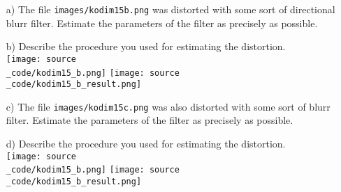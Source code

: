 \begin{enumerate}

\item[a)] The file \texttt{images/kodim15b.png} was distorted with some sort of directional blurr filter. Estimate the parameters of the filter as precisely as possible.
\item[b)] Describe the procedure you used for estimating the distortion. \\
\texttt{[image: source\\\_code/kodim15\_b.png]}
\texttt{[image: source\\\_code/kodim15\_b\_result.png]}
\item[c)] The file \texttt{images/kodim15c.png} was also distorted with some sort of blurr filter. Estimate the parameters of the filter as precisely as possible.
\item[d)] Describe the procedure you used for estimating the distortion. \\
\texttt{[image: source\\\_code/kodim15\_b.png]}
\texttt{[image: source\\\_code/kodim15\_b\_result.png]}

\end{enumerate}


